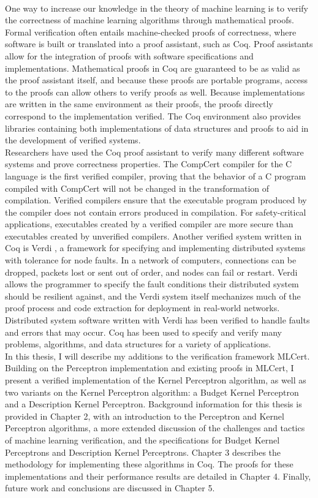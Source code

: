 \\One way to increase our knowledge in the theory of machine learning is to verify the correctness of machine learning algorithms through mathematical proofs. Formal verification often entails machine-checked proofs of correctness, where software is built or translated into a proof assistant, such as Coq. Proof assistants allow for the integration of proofs with software specifications and implementations. Mathematical proofs in Coq are guaranteed to be as valid as the proof assistant itself, and because these proofs are portable programs, access to the proofs can allow others to verify proofs as well. Because implementations are written in the same environment as their proofs, the proofs directly correspond to the implementation verified. The Coq environment also provides libraries containing both implementations of data structures and proofs to aid in the development of verified systems.
\\Researchers have used the Coq proof assistant to verify many different software systems and prove correctness properties. The CompCert compiler for the C language \cite{Ler09} is the first verified compiler, proving that the behavior of a C program compiled with CompCert will not be changed in the transformation of compilation. Verified compilers ensure that the executable program produced by the compiler does not contain errors produced in compilation. For safety-critical applications, executables created by a verified compiler are more secure than executables created by unverified compilers. Another verified system written in Coq is Verdi \cite{WWP15}, a framework for specifying and implementing distributed systems with tolerance for node faults. In a network of computers, connections can be dropped, packets lost or sent out of order, and nodes can fail or restart. Verdi allows the programmer to specify the fault conditions their distributed system should be resilient against, and the Verdi system itself mechanizes much of the proof process and code extraction for deployment in real-world networks. Distributed system software written with Verdi has been verified to handle faults and errors that may occur. Coq has been used to specify and verify many problems, algorithms, and data structures for a variety of applications.
\\In this thesis, I will describe my additions to the verification framework MLCert. Building on the Perceptron implementation and existing proofs in MLCert, I present a verified implementation of the Kernel Perceptron algorithm, as well as two variants on the Kernel Perceptron algorithm: a Budget Kernel Perceptron and a Description Kernel Perceptron. Background information for this thesis is provided in Chapter 2, with an introduction to the Perceptron and Kernel Perceptron algorithms, a more extended discussion of the challenges and tactics of machine learning verification, and the specifications for Budget Kernel Perceptrons and Description Kernel Perceptrons. Chapter 3 describes the methodology for implementing these algorithms in Coq. The proofs for these implementations and their performance results are detailed in Chapter 4. Finally, future work and conclusions are discussed in Chapter 5.

